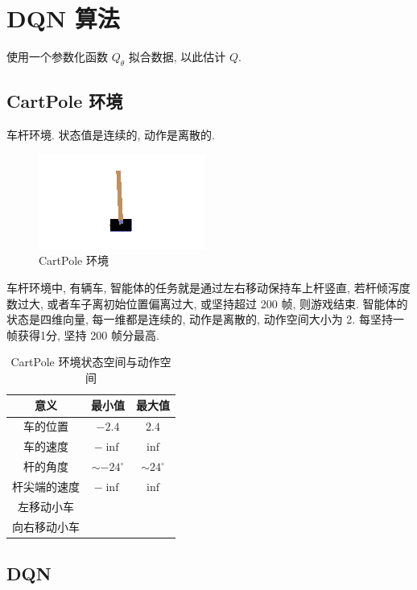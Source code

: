 \newpage
\section{DQN 算法}

使用一个参数化函数 $Q_\theta$ 拟合数据, 以此估计 $Q$. 

\subsection{CartPole 环境}
车杆环境. 状态值是连续的, 动作是离散的. 

\begin{figure}[!htb]
    \centering
    \includegraphics[width=0.618\linewidth]{pic/RL7/CartPole 环境}
    \caption{CartPole 环境}
\end{figure}


车杆环境中, 有辆车, 智能体的任务就是通过左右移动保持车上杆竖直, 若杆倾泻度数过大, 或者车子离初始位置偏离过大, 或坚持超过 200 帧, 则游戏结束. 智能体的状态是四维向量, 每一维都是连续的, 动作是离散的, 动作空间大小为 2. 每坚持一帧获得1分, 坚持 200 帧分最高. 

\begin{table}[!htb]
    \centering
    \caption{CartPole 环境状态空间与动作空间}
    \begin{tabular}[c]{ccc}\toprule
        意义 & 最小值 & 最大值 \\ \midrule
        车的位置 & $-2.4$ & $2.4$ \\
        车的速度 & $-\inf$ & $\inf$ \\
        杆的角度 & $\sim -24^\circ$ & $\sim 24^\circ$\\
        杆尖端的速度 & $-\inf$ & $\inf$ \\ \cmidrule{1-1}
        左移动小车 \\
        向右移动小车\\
        \bottomrule
    \end{tabular}
\end{table}

\subsection{DQN}

